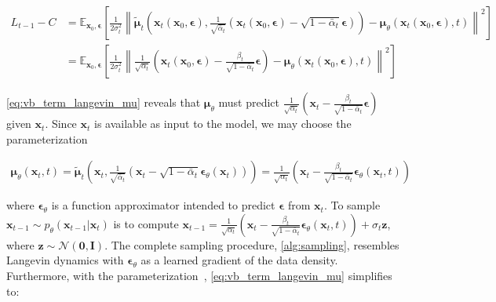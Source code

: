 \begin{align}
  L_{t-1} - C &= \mathbb{E}_{\mathbf{x}_0, {\boldsymbol{\epsilon}}}\!\left[ \frac{1}{2\sigma_t^2} \left\| \tilde{\boldsymbol{\mu}}_t\!\left(\mathbf{x}_t(\mathbf{x}_0, {\boldsymbol{\epsilon}}), \frac{1}{\sqrt{\bar\alpha_t}} (\mathbf{x}_t(\mathbf{x}_0, {\boldsymbol{\epsilon}}) - \sqrt{1-\bar\alpha_t}{\boldsymbol{\epsilon}}) \right) - {\boldsymbol{\mu}}_\theta(\mathbf{x}_t(\mathbf{x}_0, {\boldsymbol{\epsilon}}), t) \right\|^2 \right] \\

  &=\mathbb{E}_{\mathbf{x}_0, {\boldsymbol{\epsilon}}}\!\left[ \frac{1}{2\sigma_t^2} \left\| \frac{1}{\sqrt{\alpha_t}}\left( \mathbf{x}_t(\mathbf{x}_0,{\boldsymbol{\epsilon}}) - \frac{\beta_t}{\sqrt{1-\bar\alpha_t}}{\boldsymbol{\epsilon}} \right) - {\boldsymbol{\mu}}_\theta(\mathbf{x}_t(\mathbf{x}_0,{\boldsymbol{\epsilon}}), t) \right\|^2 \right] \label{eq:vb_term_langevin_mu}
\end{align}

\ref{eq:vb_term_langevin_mu} reveals that ${\boldsymbol{\mu}}_\theta$ must predict $\frac{1}{\sqrt{\alpha_t}}\left( \mathbf{x}_t  - \frac{\beta_t}{\sqrt{1-\bar\alpha_t}}{\boldsymbol{\epsilon}} \right)$ given $\mathbf{x}_t$. Since $\mathbf{x}_t$ is available as input to the model, we may choose the parameterization

\begin{align}
{\boldsymbol{\mu}}_\theta(\mathbf{x}_t, t) = \tilde{\boldsymbol{\mu}}_t\!\left(\mathbf{x}_t,  \frac{1}{\sqrt{\bar\alpha_t}} (\mathbf{x}_t - \sqrt{1-\bar\alpha_t}{\boldsymbol{\epsilon}}_\theta(\mathbf{x}_t)) \right) = \frac{1}{\sqrt{\alpha_t}}\left( \mathbf{x}_t - \frac{\beta_t}{\sqrt{1-\bar\alpha_t}} {\boldsymbol{\epsilon}}_\theta(\mathbf{x}_t, t) \right) \label{eq:mu_func_approx_langevin}
\end{align}

where ${\boldsymbol{\epsilon}}_\theta$ is a function approximator intended to predict ${\boldsymbol{\epsilon}}$ from $\mathbf{x}_t$. To sample $\mathbf{x}_{t-1} \sim p_\theta(\mathbf{x}_{t-1}|\mathbf{x}_t)$ is to compute $
\mathbf{x}_{t-1} = \frac{1}{\sqrt{\alpha_t}}\left( \mathbf{x}_t - \frac{\beta_t}{\sqrt{1-\bar\alpha_t}} {\boldsymbol{\epsilon}}_\theta(\mathbf{x}_t, t) \right) + \sigma_t \mathbf{z}$, where $\mathbf{z} \sim \mathcal{N}(\mathbf{0}, \mathbf{I})
$.
The complete sampling procedure, \ref{alg:sampling}, resembles Langevin dynamics with ${\boldsymbol{\epsilon}}_\theta$ as a learned gradient of the data density. Furthermore, with the parameterization~, \ref{eq:vb_term_langevin_mu} simplifies to:

